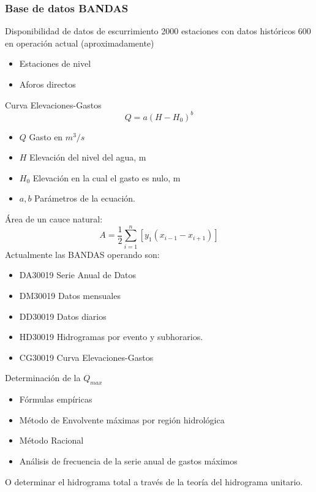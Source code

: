\subsubsection{Base de datos BANDAS}
Disponibilidad de datos de escurrimiento
2000 estaciones con datos históricos
600 en operación actual (aproximadamente)
\begin{itemize}
    \item Estaciones de nivel
    \item Aforos directos    
\end{itemize}
Curva Elevaciones-Gastos
\begin{equation}
    Q = a\left(H - H_0\right)^b
\end{equation}
\begin{notation}
    \begin{itemize}
        \item $Q$ Gasto en $m^3/s$
        \item $H$ Elevación del nivel del agua, m
        \item $H_0$ Elevación en la cual el gasto es nulo, m
        \item $a,b$ Parámetros de la ecuación.
    \end{itemize}
\end{notation}
Área de un cauce natural:
\begin{equation}
    A = \frac{1}{2}\sum_{i = 1}^n\left[y_1\left(x_{i- 1} - x_{i + 1}\right)\right]
\end{equation}
Actualmente las BANDAS operando son:
\begin{itemize}
    \item DA30019 Serie Anual de Datos
    \item DM30019 Datos mensuales
    \item DD30019 Datos diarios
    \item HD30019 Hidrogramas por evento y subhorarios.
    \item CG30019 Curva Elevaciones-Gastos
\end{itemize}
Determinación de la $Q_{max}$
\begin{itemize}
    \item Fórmulas empíricas
    \item Método de Envolvente máximas por región hidrológica
    \item Método Racional
    \item Análisis de frecuencia de la serie anual de gastos máximos
\end{itemize}
O determinar el hidrograma total a través de la teoría del hidrograma unitario.
